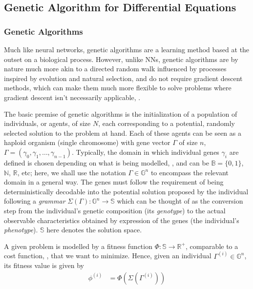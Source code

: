 \documentclass[aps,reprint,superscriptaddress,nofootinbib]{revtex4-2}
\begin{document}
\subsection{Genetic Algorithm for Differential Equations}

\subsubsection{Genetic Algorithms}

Much like neural networks, genetic algorithms are a learning method based at the outset on a biological process. However, unlike NNs, genetic algorithms are by nature much more akin to a directed random walk influenced by processes inspired by evolution and natural selection, and do not require gradient descent methods, which can make them much more flexible to solve problems where gradient descent isn't necessarily applicable, \cite{gen_book}.

The basic premise of genetic algorithms is the initialization of a population of individuals, or agents, of size \(N\), each corresponding to a potential, randomly selected solution to the problem at hand. Each of these agents can be seen as a haploid organism (single chromosome) with gene vector \(\Gamma\) of size \(n\), \(\Gamma = \left(\gamma_0, \gamma_1, \ldots, \gamma_{n-1}\right)\). Typically, the domain in which individual genes \(\gamma_i\) are defined is chosen depending on what is being modelled, \cite{parameterless_ga}, and can be \(\mathbb{B} = \{0, 1\}\), \(\mathbb{N}\), \(\mathbb{R}\), etc; here, we shall use the notation \(\Gamma \in \mathbb{G}^n\) to encompass the relevant domain in a general way. The genes must follow the requirement of being deterministically decodable into the potential solution proposed by the individual following a \textit{grammar} \(\Sigma\left(\Gamma\right): \mathbb{G}^n \to \mathbb{S}\) which can be thought of as the conversion step from the individual's genetic composition (its \textit{genotype}) to the actual observable characteristics obtained by expression of the genes (the individual's \textit{phenotype}). \(\mathbb{S}\) here denotes the solution space.

A given problem is modelled by a fitness function \(\Phi: \mathbb{S} \to \mathbb{R}^+\), comparable to a cost function, \cite{ga}, that we want to minimize. Hence, given an individual \(\Gamma^{(i)} \in \mathbb{G}^n\), its fitness value is given by
\begin{align*}
    \phi^{(i)} &= \Phi\left(\Sigma\left(\Gamma^{(i)}\right)\right)
\end{align*}
\end{document}
